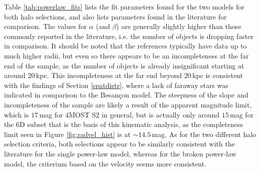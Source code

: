 \documentclass[a4paper,11pt]{article}
\begin{document}
%
Table \ref{tab:powerlaw_fits} lists the fit parameters found for the two models for both halo selections, and also lists parameters found in the literature for comparison. The values for $\alpha$ (and $\beta$) are generally slightly higher than those commonly reported in the literature, i.e. the number of objects is dropping faster in comparison. It should be noted that the references typically have data up to much higher radii, but even so there appears to be an incompleteness at the far end of the sample, as the number of objects is already insignificant starting at around $20$\,kpc. This incompleteness at the far end beyond $20$\,kpc is consistent with the findings of Section \ref{spatdistr}, where a lack of faraway stars was indicated in comparison to the Besan\c{c}on model. The steepness of the slope and incompleteness of the sample are likely a result of the apparent magnitude limit, which is $17$\,mag for 4MOST S2 in general, but is actually only around $15$\,mag for the 6D subset that is the basis of this kinematic analysis, as the completeness limit seen in Figure \ref{fig:radvel_hist} is at ${\sim}14.5$\,mag. As for the two different halo selection criteria, both selections appear to be similarly consistent with the literature for the single power-law model, whereas for the broken power-law model, the criterium based on the velocity seems more consistent.
%
\end{document}
